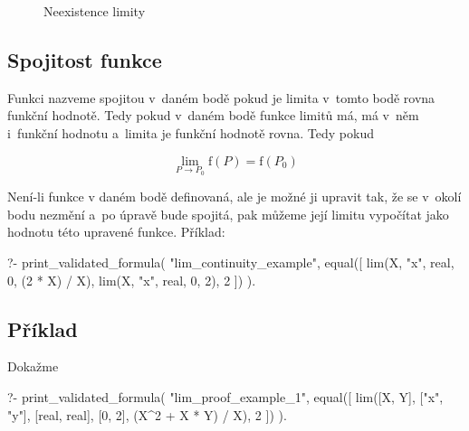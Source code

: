 \begin{figure}
\begin{center}
\caption{Neexistence limity}
\end{center}
\label{img:neexistence_limity}
\end{figure}

\subsection{Spojitost funkce}
\label{sec:spojitost_funkce}

Funkci nazveme spojitou v~daném bodě pokud je limita v~tomto bodě rovna funkční hodnotě. Tedy pokud v~daném bodě funkce limitů má, má v~něm i~funkční hodnotu a~limita je funkční hodnotě rovna. Tedy pokud

\begin{equation}
\lim_{P \to P_0} \mathrm{f}(P) = \mathrm{f}(P_0)
\end{equation}

Není-li funkce v daném bodě definovaná, ale je možné ji upravit tak, že se v~okolí bodu nezmění a~po úpravě bude spojitá, pak můžeme její limitu vypočítat jako hodnotu této upravené funkce. Příklad:

\begin{prolog}
?-	print_validated_formula(
		"lim_continuity_example",
		equal([
			lim(X, "x", real, 0, (2 * X) / X),
			lim(X, "x", real, 0, 2),
			2
		])
	).
\end{prolog}

\subsection{Příklad}

Dokažme

\begin{prolog}
?-	print_validated_formula(
		"lim_proof_example_1",
		equal([
			lim([X, Y], ["x", "y"], [real, real], [0, 2], (X^2 + X * Y) / X),
			2
		])
	).
\end{prolog}

